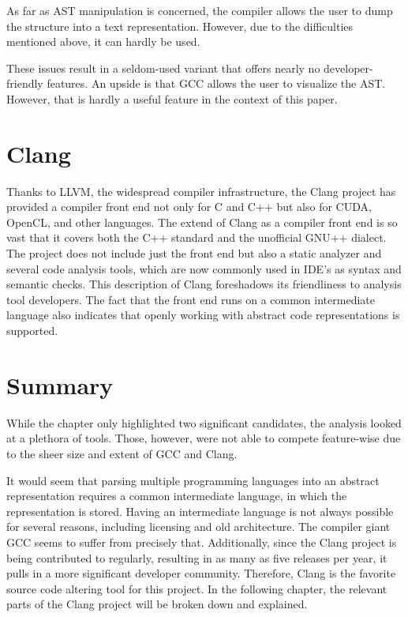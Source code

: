 As far as AST manipulation is concerned, the compiler allows the user to dump 
the structure into a text representation. 
However, due to the difficulties mentioned above, it can hardly be used.

\lipsum[11]

These issues result in a seldom-used variant that offers nearly 
no developer-friendly features. 
An upside is that GCC allows the user to visualize the AST. 
However, that is hardly a useful feature in the context of this paper.

\section{Clang}

Thanks to LLVM, the widespread compiler infrastructure, the Clang project 
has provided a compiler front end not only for C and C++ but also 
for CUDA, OpenCL, and other languages. 
The extend of Clang as a compiler front end is so vast that it covers 
both the C++ standard and the unofficial GNU++ dialect.
The project does not include just the front end but also a static analyzer 
and several code analysis tools, which are now commonly used in IDE's as 
syntax and semantic checks. 
This description of Clang foreshadows its friendliness to analysis tool developers. 
The fact that the front end runs on a common intermediate language also indicates 
that openly working with abstract code representations is supported.

\lipsum[11]

\section{Summary}

While the chapter only highlighted two significant candidates, the analysis 
looked at a plethora of tools. 
Those, however, were not able to compete feature-wise due to the sheer size 
and extent of GCC and Clang. 

It would seem that parsing multiple programming languages into an abstract 
representation requires a common intermediate language, in which 
the representation is stored. 
Having an intermediate language is not always possible for several reasons, 
including licensing and old architecture. 
The compiler giant GCC seems to suffer from precisely that.
Additionally, since the Clang project is being contributed to regularly, 
resulting in as many as five releases per year, 
it pulls in a more significant developer community. 
Therefore, Clang is the favorite source code altering tool for this project. 
In the following chapter, the relevant parts of the Clang project 
will be broken down and explained.